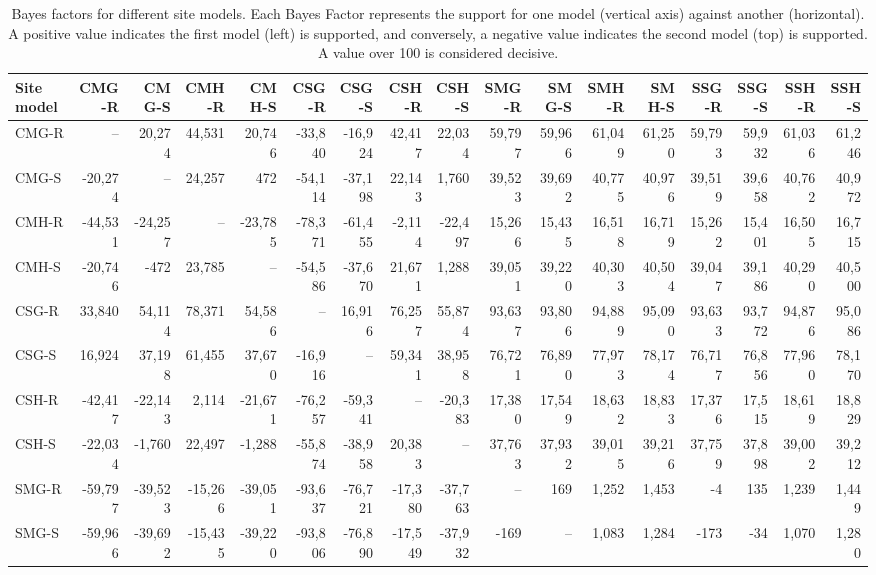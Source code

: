 \documentclass[]{article}
\begin{document}
\begin{landscape}\begin{table}

\caption{\label{tab:site-models}Bayes factors for different site models. Each Bayes Factor represents the support for one model (vertical axis) against another (horizontal). A positive value indicates the first model (left) is supported, and conversely, a negative value indicates the second model (top) is supported. A value over 100 is considered decisive.}
\centering
\fontsize{8}{10}\selectfont
\begin{tabular}[t]{lrrrrrrrrrrrrrrrr}
\toprule
Site model & CMG-R & CMG-S & CMH-R & CMH-S & CSG-R & CSG-S & CSH-R & CSH-S & SMG-R & SMG-S & SMH-R & SMH-S & SSG-R & SSG-S & SSH-R & SSH-S\\
\midrule
CMG-R & -- & 20,274 & 44,531 & 20,746 & -33,840 & -16,924 & 42,417 & 22,034 & 59,797 & 59,966 & 61,049 & 61,250 & 59,793 & 59,932 & 61,036 & 61,246\\
CMG-S & -20,274 & -- & 24,257 & 472 & -54,114 & -37,198 & 22,143 & 1,760 & 39,523 & 39,692 & 40,775 & 40,976 & 39,519 & 39,658 & 40,762 & 40,972\\
CMH-R & -44,531 & -24,257 & -- & -23,785 & -78,371 & -61,455 & -2,114 & -22,497 & 15,266 & 15,435 & 16,518 & 16,719 & 15,262 & 15,401 & 16,505 & 16,715\\
CMH-S & -20,746 & -472 & 23,785 & -- & -54,586 & -37,670 & 21,671 & 1,288 & 39,051 & 39,220 & 40,303 & 40,504 & 39,047 & 39,186 & 40,290 & 40,500\\
\addlinespace
CSG-R & 33,840 & 54,114 & 78,371 & 54,586 & -- & 16,916 & 76,257 & 55,874 & 93,637 & 93,806 & 94,889 & 95,090 & 93,633 & 93,772 & 94,876 & 95,086\\
CSG-S & 16,924 & 37,198 & 61,455 & 37,670 & -16,916 & -- & 59,341 & 38,958 & 76,721 & 76,890 & 77,973 & 78,174 & 76,717 & 76,856 & 77,960 & 78,170\\
CSH-R & -42,417 & -22,143 & 2,114 & -21,671 & -76,257 & -59,341 & -- & -20,383 & 17,380 & 17,549 & 18,632 & 18,833 & 17,376 & 17,515 & 18,619 & 18,829\\
CSH-S & -22,034 & -1,760 & 22,497 & -1,288 & -55,874 & -38,958 & 20,383 & -- & 37,763 & 37,932 & 39,015 & 39,216 & 37,759 & 37,898 & 39,002 & 39,212\\
\addlinespace
SMG-R & -59,797 & -39,523 & -15,266 & -39,051 & -93,637 & -76,721 & -17,380 & -37,763 & -- & 169 & 1,252 & 1,453 & -4 & 135 & 1,239 & 1,449\\
SMG-S & -59,966 & -39,692 & -15,435 & -39,220 & -93,806 & -76,890 & -17,549 & -37,932 & -169 & -- & 1,083 & 1,284 & -173 & -34 & 1,070 & 1,280\\

\end{tabular}
\end{table}
\end{landscape}
\end{document}
